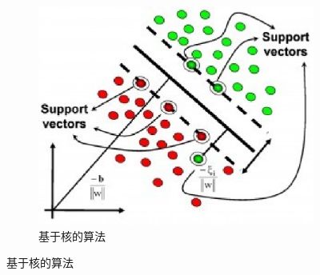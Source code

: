 \begin{figure}[htp]
\begin{subfigure}{.33\textwidth}
	   \includegraphics[width=\linewidth]{imgs/2.1.6.eps}
	   \caption{基于核的算法}
	   \label{fig:2.sub.6}
	 \end{subfigure}%


\end{figure}
